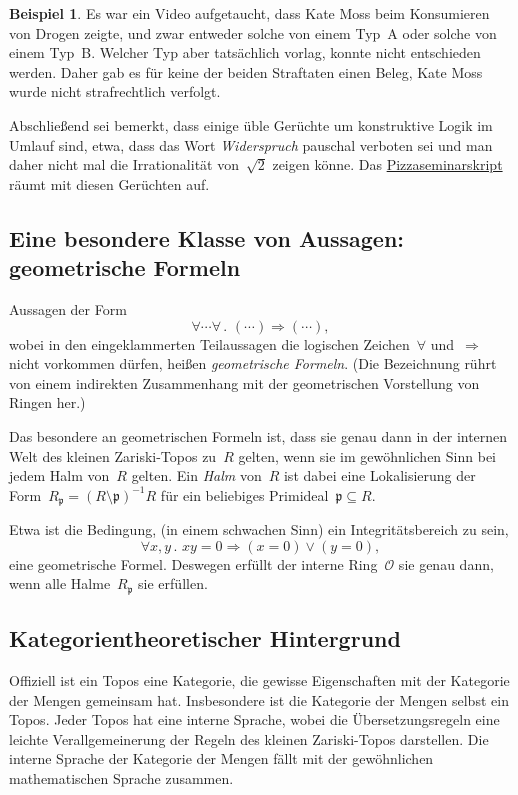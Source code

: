 \documentclass[a4paper,ngerman,12pt]{scrartcl}
\theoremstyle{definition}
\newtheorem{bsp}[defn]{Beispiel}
\theoremstyle{plain}
\theoremstyle{remark}
\newcommand{\pp}{\mathfrak{p}}
\renewcommand{\O}{\mathcal{O}}
\renewcommand{\_}{\mathpunct{.}\,}
\newcommand{\?}{\,{:}\,}
\begin{document}
\begin{bsp}
Es war ein Video aufgetaucht, dass Kate Moss beim Konsumieren von Drogen zeigte,
und zwar entweder solche von einem Typ~A oder solche von einem Typ~B. Welcher
Typ aber tatsächlich vorlag, konnte nicht entschieden werden. Daher gab es für
keine der beiden Straftaten einen Beleg, Kate Moss wurde nicht
strafrechtlich verfolgt.
\end{bsp}

Abschließend sei bemerkt, dass einige üble Gerüchte um konstruktive Logik im
Umlauf sind, etwa, dass das Wort \!\emph{Widerspruch} pauschal verboten sei und
man daher nicht mal die Irrationalität von~$\sqrt{2}$ zeigen könne. Das
\href{http://pizzaseminar.speicherleck.de/skript2/konstruktive-mathematik.pdf}{Pizzaseminarskript} räumt mit diesen Gerüchten auf.


\subsection*{Eine besondere Klasse von Aussagen: geometrische Formeln}

Aussagen der Form
\[ \forall \cdots \forall\_ (\cdots) \Rightarrow (\cdots), \]
wobei in den eingeklammerten Teilaussagen die logischen Zeichen~$\forall$
und~$\Rightarrow$ nicht vorkommen dürfen, heißen \emph{geometrische Formeln}.
(Die Bezeichnung rührt von einem indirekten Zusammenhang mit der geometrischen
Vorstellung von Ringen her.)

Das besondere an geometrischen Formeln ist, dass sie genau dann in der internen
Welt des kleinen Zariski-Topos zu~$R$ gelten, wenn sie im gewöhnlichen Sinn bei
jedem Halm von~$R$ gelten. Ein \emph{Halm} von~$R$ ist dabei eine Lokalisierung
der Form~$R_\pp = (R \setminus \pp)^{-1}R$ für ein beliebiges Primideal~$\pp
\subseteq R$.

Etwa ist die Bedingung, (in einem schwachen Sinn) ein Integritätsbereich zu
sein,
\[ \forall x,y\_ xy = 0 \Rightarrow (x = 0) \vee (y = 0), \]
eine geometrische Formel. Deswegen erfüllt der interne Ring~$\O$ sie genau
dann, wenn alle Halme~$R_\pp$ sie erfüllen.



\subsection*{Kategorientheoretischer Hintergrund}

Offiziell ist ein Topos eine Kategorie, die gewisse Eigenschaften mit der
Kategorie der Mengen gemeinsam hat. Insbesondere ist die Kategorie der Mengen
selbst ein Topos. Jeder Topos hat eine interne Sprache, wobei die
Übersetzungsregeln eine leichte Verallgemeinerung der Regeln des kleinen
Zariski-Topos darstellen. Die interne Sprache der Kategorie der Mengen fällt
mit der gewöhnlichen mathematischen Sprache zusammen.
\end{document}
